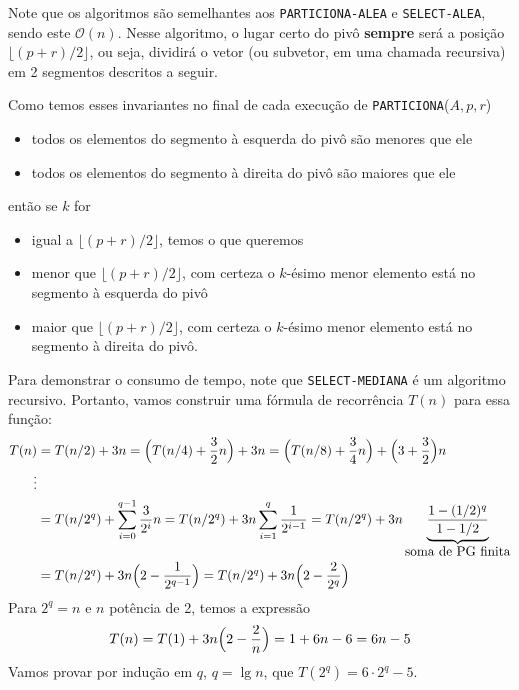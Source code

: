 \documentclass{article}
\newcommand{\bigO}[1]{\ensuremath{\mathcal{O}(#1)}}
\begin{document}
Note que os algoritmos são semelhantes aos \texttt{PARTICIONA-ALEA} e \texttt{SELECT-ALEA}, sendo este \bigO{n}.
Nesse algoritmo, o lugar certo do pivô \textbf{sempre} será a posição $\lfloor (p+r)/2 \rfloor$, ou seja, dividirá o vetor (ou subvetor, em uma chamada recursiva) em 2 segmentos descritos a seguir.

Como temos esses invariantes no final de cada execução de \texttt{PARTICIONA}($A,p,r$)
\begin{itemize}
  \item todos os elementos do segmento à esquerda do pivô são menores que ele 
  \item todos os elementos do segmento à direita do pivô são maiores que ele
\end{itemize}
então se $k$ for
\begin{itemize}
  \item igual a $\lfloor (p+r)/2 \rfloor$, temos o que queremos
  \item menor que $\lfloor (p+r)/2 \rfloor$, com certeza o $k$-ésimo menor elemento está no segmento à esquerda do pivô
  \item maior que $\lfloor (p+r)/2 \rfloor$, com certeza o $k$-ésimo menor elemento está no segmento à direita do pivô.
\end{itemize}



Para demonstrar o consumo de tempo, note que \texttt{SELECT-MEDIANA} é um algoritmo recursivo.
Portanto, vamos construir uma fórmula de recorrência $T(n)$ para essa função:
\begin{align*}
  T(n) &= T(n/2) + 3n
  = \Bigl(T(n/4) + \frac{3}{2}n\Bigr) + 3n
  = \Bigl(T(n/8) + \frac{3}{4}n\Bigr) + \Bigl(3 + \frac{3}{2}\Bigr) n \\
  \vdots \\
  &= T(n/2^q) + \sum_{i=0}^{q-1} \frac{3}{2^i}n
  = T(n/2^q) + 3n \sum_{i=1}^{q} \frac{1}{2^{i-1}}
  = T(n/2^q) + 3n \underbrace{\frac{1 - (1/2)^q}{1 - 1/2}}_{\mbox{soma de PG finita}} \\
  &= T(n/2^q) + 3n \Bigl(2 -\frac{1}{2^{q-1}} \Bigr)
  = T(n/2^q) + 3n \Bigl(2 -\frac{2}{2^q} \Bigr)
\end{align*}
Para $2^q = n$ e $n$ potência de 2, temos a expressão
\begin{align*}
  T(n) = T(1) + 3n \Bigl(2 - \frac{2}{n} \Bigr) = 1 + 6n - 6 = 6n - 5
\end{align*}
Vamos provar por indução em $q$, $q=\lg n$, que $T(2^q) = 6\cdot 2^q - 5$.
\end{document}
